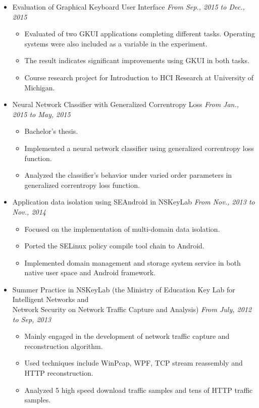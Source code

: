 \documentclass[letterpaper,11pt]{article}
\newenvironment{extra}{}{}
\begin{document}
\begin{itemize}
\begin{extra}
    \item Evaluation of Graphical Keyboard User Interface \hfill \textit{From Sep., 2015 to Dec., 2015}
    \begin{itemize}
        \item Evaluated of two GKUI applications completing different tasks. Operating systems were also
included as a variable in the experiment.
        \item The result indicates significant improvements using GKUI in both tasks.
        \item Course research project for Introduction to HCI Research at University of Michigan.
    \end{itemize}
\end{extra}

    \item Neural Network Classifier with Generalized Correntropy Loss \hfill \textit{From Jan., 2015 to
May, 2015}
    \begin{itemize}
        \item Bachelor's thesis.
        \item Implemented a neural network classifier using generalized correntropy loss function.
        \item Analyzed the classifier's behavior under varied order parameters in generalized correntropy loss
function.
    \end{itemize}

\begin{extra}
    \item Application data isolation using SEAndroid in NSKeyLab \hfill \textit{From Nov., 2013 to Nov., 2014}
    \begin{itemize}
        \item Focused on the implementation of multi-domain data isolation.
        \item Ported the SELinux policy compile tool chain to Android.
        \item Implemented domain management and storage system service in both native user space and Android
framework.
    \end{itemize}
\end{extra}

\begin{extra}
    \item Summer Practice in NSKeyLab (the Ministry of Education Key Lab for Intelligent Networks and \\ Network
    Security on Network Traffic Capture and Analysis) \hfill \textit{From July, 2012 to Sep, 2013}
    \begin{itemize}
        \item Mainly engaged in the development of network traffic capture and reconstruction algorithm.
        \item Used techniques include WinPcap, WPF, TCP stream reassembly and HTTP reconstruction.
        \item Analyzed 5 high speed download traffic samples and tens of HTTP traffic samples.
    \end{itemize}
\end{extra}


\end{itemize}
\end{document}
